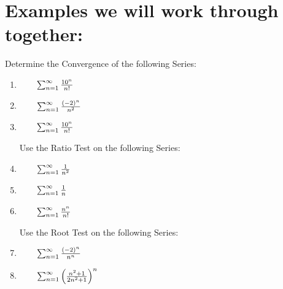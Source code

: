 \documentclass[10pt]{article}
\begin{document}



\section*{Examples we will work through together:}

Determine the Convergence of the following Series:
\begin{enumerate}%

\item  \(\qquad\sum_{n=1}^\infty \frac{10^n}{n!}\)
\vfill

\item  \(\qquad\sum_{n=1}^\infty \frac{(-2)^n}{n^2}\)
\vfill

\item  \(\qquad\sum_{n=1}^\infty \frac{10^n}{n!}\)
\vfill


\pagebreak

\hspace{-.75in} Use the Ratio Test on the following Series:

\item  \(\qquad\sum_{n=1}^\infty \frac{1}{n^2}\)
\vfill

\item  \(\qquad\sum_{n=1}^\infty \frac{1}{n}\)

\vfill

\item \(\qquad\sum_{n=1}^\infty	\frac{n^n}{n!}\)
\vfill

\hspace*{-.75in}Use the Root Test on the following Series:

\item  \(\qquad\sum_{n=1}^\infty \frac{(-2)^n}{n^n}\)

\vfill
\item \(\qquad\sum_{n=1}^\infty	\left(\frac{n^2+1}{2n^2+1}\right)^n\)
\vfill

\end{enumerate}
\end{document}
